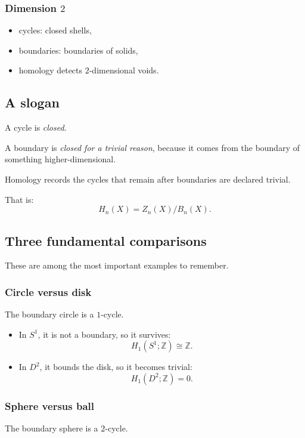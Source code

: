 \documentclass[12pt,a4paper]{article}
\newcommand{\Z}{\mathbb{Z}}
\theoremstyle{notespace}
\begin{document}
\subsubsection*{Dimension \(2\)}
\begin{itemize}
	\item cycles: closed shells,
	\item boundaries: boundaries of solids,
	\item homology detects \(2\)-dimensional voids.
\end{itemize}

\subsection{A slogan}

A cycle is \emph{closed}.

A boundary is \emph{closed for a trivial reason}, because it comes from the boundary of something higher-dimensional.

Homology records the cycles that remain after boundaries are declared trivial.

That is:
\[
H_n(X)=Z_n(X)/B_n(X).
\]

\subsection{Three fundamental comparisons}

These are among the most important examples to remember.

\subsubsection*{Circle versus disk}

The boundary circle is a \(1\)-cycle.

\begin{itemize}
	\item In \(S^1\), it is not a boundary, so it survives:
	\[
	H_1(S^1;\Z)\cong \Z.
	\]
	\item In \(D^2\), it bounds the disk, so it becomes trivial:
	\[
	H_1(D^2;\Z)=0.
	\]
\end{itemize}

\subsubsection*{Sphere versus ball}

The boundary sphere is a \(2\)-cycle.
\end{document}
